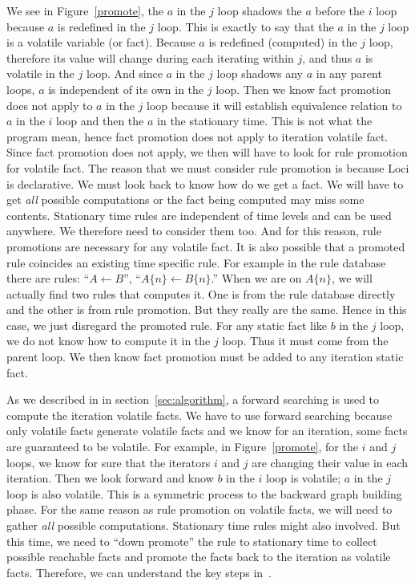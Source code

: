 \documentclass{article}
\begin{document}
We see in Figure~\ref{promote}, the $a$ in the $j$ loop shadows the
$a$ before the $i$ loop because $a$ is redefined in the $j$ loop. This
is exactly to say that the $a$ in the $j$ loop is a volatile variable
(or fact). Because $a$ is redefined (computed) in the $j$ loop,
therefore its value will change during each iterating within $j$, and
thus $a$ is volatile in the $j$ loop. And since $a$ in the $j$ loop
shadows any $a$ in any parent loops, $a$ is independent of its own in
the $j$ loop. Then we know fact promotion does not apply to $a$ in
the $j$ 
loop because it will establish equivalence relation to $a$ in the $i$
loop and then the $a$ in the stationary time. This is not what the
program mean, hence fact promotion does not
apply to iteration volatile fact. Since fact promotion does not apply,
we then will have to look for rule promotion for volatile fact. The
reason that we must consider rule promotion is because Loci is
declarative. We must look back to know how do we get a fact. We
will have to get {\it all} possible computations or the fact being
computed may miss some contents. Stationary time rules are independent
of time levels and can be used anywhere. We therefore need to consider
them too. And for this reason, rule promotions are necessary for any
volatile fact. It is also possible that a promoted rule coincides an
existing time specific rule. For example in the rule database there
are rules: ``$A \gets B$'', ``$A\{n\} \gets B\{n\}$.'' When we are on
$A\{n\}$, we will actually find two rules that computes it. One is
from the rule database directly and the other is from rule
promotion. But they really are the same. Hence in this case, we just
disregard the promoted rule. For any static fact like $b$ in the
$j$ loop, we do not know how to compute it in the $j$ loop. Thus
it must come from the parent loop. We then know fact promotion must be
added to any iteration static fact. 

As we described in  in
section~\ref{sec:algorithm}, a forward searching is used to compute
the iteration volatile facts. We have to use forward searching because
only volatile facts generate volatile facts and we know for an
iteration, some facts are guaranteed to be volatile. For example, in
Figure~\ref{promote}, for the $i$ and $j$ loops, we know for sure that
the iterators $i$ and $j$ are changing their value in each
iteration. Then we look forward and know $b$ in the $i$ loop is
volatile; $a$ in the $j$ loop is also volatile. This is a symmetric
process to the backward graph building phase. For the same reason as
rule promotion on volatile facts, we will need to gather {\it all}
possible computations. Stationary time rules might also involved. But
this time, we need to ``down promote'' the rule to stationary time to
collect possible reachable facts and promote the facts back to the
iteration as volatile facts. Therefore, we can understand the key
steps in~. 
\end{document}
